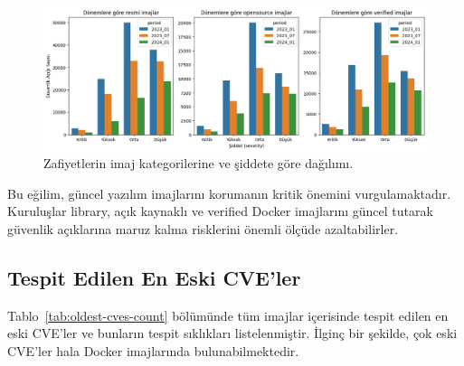 \begin{figure}
    \centering
    \includegraphics[width=1\linewidth]{images/s2/image-type-severity.png}
    \caption{Zafiyetlerin imaj kategorilerine ve şiddete göre dağılımı.}\label{fig:image-type-severity}
\end{figure}

Bu eğilim, güncel yazılım imajlarını korumanın kritik önemini vurgulamaktadır. Kuruluşlar library, açık kaynaklı ve verified Docker imajlarını güncel tutarak güvenlik açıklarına maruz kalma risklerini önemli ölçüde azaltabilirler.

\subsection{Tespit Edilen En Eski CVE'ler}\label{subsec:detected-oldest-cves}

Tablo~\ref{tab:oldest-cves-count} bölümünde tüm imajlar içerisinde tespit edilen en eski CVE'ler ve bunların tespit sıklıkları listelenmiştir. İlginç bir şekilde, çok eski CVE'ler hala Docker imajlarında bulunabilmektedir.

